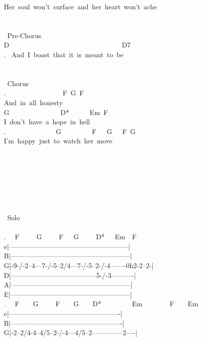 {Her\ soul\ won't\ surface\ and\ her\ heart\ won't\ ache\\
\\
\\
\lbrack\ Pre-Chorus\rbrack\\
D\ \ \ \ \ \ \ \ \ \ \ \ \ \ \ \ \ \ \ \ \ \ \ \ \ \ \ \ \ \ \ \ \ D7\\
. \ And\ I\ boast\ that\ it\ is\ meant\ to\ be\\
\\
\\
\lbrack\ Chorus\rbrack\\
. \ \ \ \ \ \ \ \ \ \ \ \ \ \ \ \ F\ G\ F\\
And\ in\ all\ honesty\\
G\ \ \ \ \ \ \ \ \ \ \ \ \ \ \ D*\ \ \ \ \ \ Em\ F\\
I\ don't\ have\ a\ hope\ in\ hell\\
. \ \ \ \ \ \ \ \ \ \ \ \ \ \ G\ \ \ \ \ \ \ \ \ F\ \ \ G\ \ \ F\ G\\
I'm\ happy\ just\ to\ watch\ her\ move\\
\\
\\
\\
\\
\\
\\
\\
\lbrack\ Solo\rbrack\\
\\
. \ \ F\ \ \ \ \ G\ \ \ \ \ F\ \ \ G\ \ \ \ \ D*\ \ \ Em\ \ F\\
e|-----------------------------------------------------|\\
B|-----------------------------------------------------|\\
G|-9-/-2--4---7-/-5--2/4---7-/-5--2-/-4-------0h2-2--2-|\\
D|--------------------------------------5-/-3----------|\\
A|-----------------------------------------------------|\\
E|-----------------------------------------------------|\\
. \ \ F\ \ \ \ G\ \ \ \ \ F\ \ \ \ G\ \ \ \ D*\ \ \ \ \ \ \ \ \ Em\ \ \ \ \ \ \ \ F\ \ \ \ Em\\
e|-------------------------------------------------|\\
B|-------------------------------------------------|\\
G|-2--2/4-4--4/5--2-/-4---4/5--2--------------2----|\\
}
